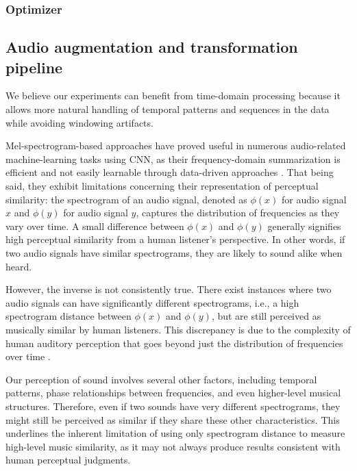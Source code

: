 

\subsubsection{Optimizer}

\subsection{Audio augmentation and transformation pipeline}

We believe our experiments can benefit from time-domain processing because it allows more natural handling of temporal patterns and sequences in the data while avoiding windowing artifacts.

Mel-spectrogram-based approaches have proved useful in numerous audio-related machine-learning tasks using CNN, as their frequency-domain summarization is efficient and not easily learnable through data-driven approaches \cite{Kim2020OneStrategies}. That being said,  they exhibit limitations concerning their representation of perceptual similarity: the spectrogram of an audio signal, denoted as $\phi(x)$ for audio signal $x$ and $\phi(y)$ for audio signal $y$, captures the distribution of frequencies as they vary over time. A small difference between $\phi(x)$ and $\phi(y)$ generally signifies high perceptual similarity from a human listener's perspective. In other words, if two audio signals have similar spectrograms, they are likely to sound alike when heard.

However, the inverse is not consistently true. There exist instances where two audio signals can have significantly different spectrograms, i.e., a high spectrogram distance between $\phi(x)$ and $\phi(y)$, but are still perceived as musically similar by human listeners. This discrepancy is due to the complexity of human auditory perception that goes beyond just the distribution of frequencies over time \cite{Mesostructures2023}.

Our perception of sound involves several other factors, including temporal patterns, phase relationships between frequencies, and even higher-level musical structures. Therefore, even if two sounds have very different spectrograms, they might still be perceived as similar if they share these other characteristics. This underlines the inherent limitation of using only spectrogram distance to measure high-level music similarity, as it may not always produce results consistent with human perceptual judgments.

